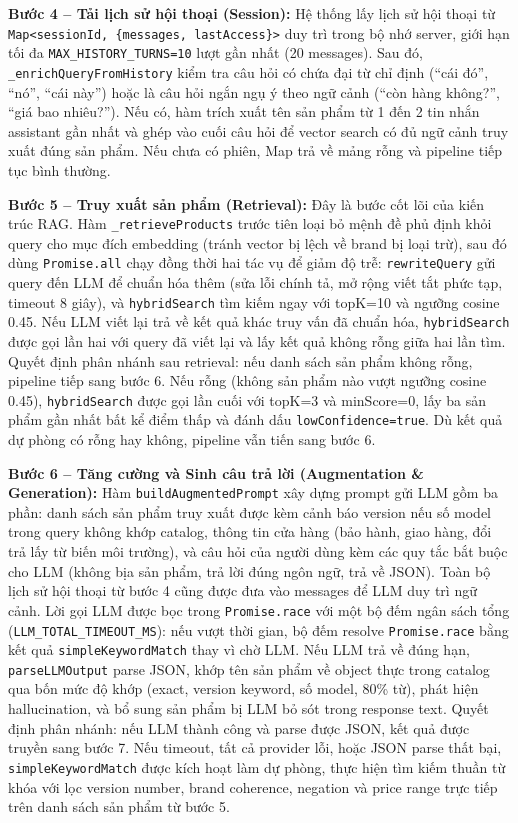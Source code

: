 \begin{sloppypar}
\textbf{Bước 4 -- Tải lịch sử hội thoại (Session):} Hệ thống lấy lịch sử hội thoại từ \texttt{Map<sessionId, \{messages, lastAccess\}>} duy trì trong bộ nhớ server, giới hạn tối đa \texttt{MAX\_HISTORY\_TURNS=10} lượt gần nhất (20 messages). Sau đó, \texttt{\_enrichQueryFromHistory} kiểm tra câu hỏi có chứa đại từ chỉ định (``cái đó'', ``nó'', ``cái này'') hoặc là câu hỏi ngắn ngụ ý theo ngữ cảnh (``còn hàng không?'', ``giá bao nhiêu?''). Nếu có, hàm trích xuất tên sản phẩm từ 1 đến 2 tin nhắn assistant gần nhất và ghép vào cuối câu hỏi để vector search có đủ ngữ cảnh truy xuất đúng sản phẩm. Nếu chưa có phiên, Map trả về mảng rỗng và pipeline tiếp tục bình thường.

\textbf{Bước 5 -- Truy xuất sản phẩm (Retrieval):} Đây là bước cốt lõi của kiến trúc RAG. Hàm \texttt{\_retrieveProducts} trước tiên loại bỏ mệnh đề phủ định khỏi query cho mục đích embedding (tránh vector bị lệch về brand bị loại trừ), sau đó dùng \texttt{Promise.all} chạy đồng thời hai tác vụ để giảm độ trễ: \texttt{rewriteQuery} gửi query đến LLM để chuẩn hóa thêm (sửa lỗi chính tả, mở rộng viết tắt phức tạp, timeout 8 giây), và \texttt{hybridSearch} tìm kiếm ngay với topK=10 và ngưỡng cosine 0.45. Nếu LLM viết lại trả về kết quả khác truy vấn đã chuẩn hóa, \texttt{hybridSearch} được gọi lần hai với query đã viết lại và lấy kết quả không rỗng giữa hai lần tìm. Quyết định phân nhánh sau retrieval: nếu danh sách sản phẩm không rỗng, pipeline tiếp sang bước 6. Nếu rỗng (không sản phẩm nào vượt ngưỡng cosine 0.45), \texttt{hybridSearch} được gọi lần cuối với topK=3 và minScore=0, lấy ba sản phẩm gần nhất bất kể điểm thấp và đánh dấu \texttt{lowConfidence=true}. Dù kết quả dự phòng có rỗng hay không, pipeline vẫn tiến sang bước 6.

\textbf{Bước 6 -- Tăng cường và Sinh câu trả lời (Augmentation \& Generation):} Hàm \texttt{buildAugmentedPrompt} xây dựng prompt gửi LLM gồm ba phần: danh sách sản phẩm truy xuất được kèm cảnh báo version nếu số model trong query không khớp catalog, thông tin cửa hàng (bảo hành, giao hàng, đổi trả lấy từ biến môi trường), và câu hỏi của người dùng kèm các quy tắc bắt buộc cho LLM (không bịa sản phẩm, trả lời đúng ngôn ngữ, trả về JSON). Toàn bộ lịch sử hội thoại từ bước 4 cũng được đưa vào messages để LLM duy trì ngữ cảnh. Lời gọi LLM được bọc trong \texttt{Promise.race} với một bộ đếm ngân sách tổng (\texttt{LLM\_TOTAL\_TIMEOUT\_MS}): nếu vượt thời gian, bộ đếm resolve \texttt{Promise.race} bằng kết quả \texttt{simpleKeywordMatch} thay vì chờ LLM. Nếu LLM trả về đúng hạn, \texttt{parseLLMOutput} parse JSON, khớp tên sản phẩm về object thực trong catalog qua bốn mức độ khớp (exact, version keyword, số model, 80\% từ), phát hiện hallucination, và bổ sung sản phẩm bị LLM bỏ sót trong response text. Quyết định phân nhánh: nếu LLM thành công và parse được JSON, kết quả được truyền sang bước 7. Nếu timeout, tất cả provider lỗi, hoặc JSON parse thất bại, \texttt{simpleKeywordMatch} được kích hoạt làm dự phòng, thực hiện tìm kiếm thuần từ khóa với lọc version number, brand coherence, negation và price range trực tiếp trên danh sách sản phẩm từ bước 5.


\end{sloppypar}
